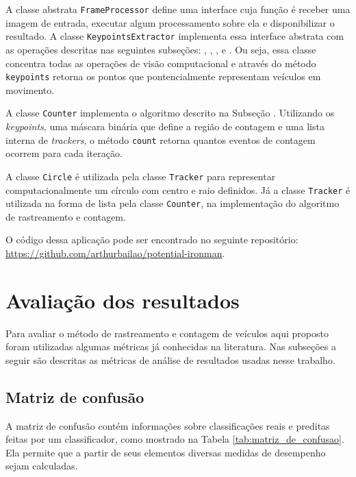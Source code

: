A classe abstrata \verb!FrameProcessor! define uma interface cuja função é receber uma imagem de entrada, executar algum processamento sobre ela e disponibilizar o resultado. A classe \verb!KeypointsExtractor! implementa essa interface abstrata com as operações descritas nas seguintes subseções: , , ,  e . Ou seja, essa classe concentra todas as operações de visão computacional e através do método \verb!keypoints! retorna os pontos que pontencialmente representam veículos em movimento.

A classe \verb!Counter! implementa o algoritmo descrito na Subseção . Utilizando os \textit{keypoints}, uma máscara binária que define a região de contagem e uma lista interna de \textit{trackers}, o método \verb!count! retorna quantos eventos de contagem ocorrem para cada iteração.

A classe \verb!Circle! é utilizada pela classe \verb!Tracker! para representar computacionalmente um círculo com centro e raio definidos. Já a classe \verb!Tracker! é utilizada na forma de lista pela classe \verb!Counter!, na implementação do algoritmo de rastreamento e contagem.

O código dessa aplicação pode ser encontrado no seguinte repositório: \url{https://github.com/arthurbailao/potential-ironman}.


\section{Avaliação dos resultados} %
\label{sec:avalia_o_dos_resultados}

Para avaliar o método de rastreamento e contagem de veículos aqui proposto foram utilizadas algumas métricas já conhecidas na literatura. Nas subseções a seguir são descritas as métricas de análise de resultados usadas nesse trabalho.

\subsection{Matriz de confusão} %
\label{sub:matriz_de_confus_o}

A matriz de confusão contém informações sobre classificações reais e preditas feitas por um classificador, como mostrado na Tabela \ref{tab:matriz_de_confusao}. Ela permite que a partir de seus elementos diversas medidas de desempenho sejam calculadas.

